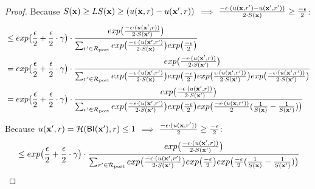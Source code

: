 \documentclass{article}
\begin{document}
\begin{proof}
  Because $S(\textbf{x}) \geq LS(\textbf{x}) \geq (u(\textbf{x}, {r}) - u(\textbf{x}', {r}))$ $\implies$ $ \frac{-\epsilon\cdot(u(\textbf{x}, {r'}) - u(\textbf{x}', {r'}))}{2 \cdot S(\textbf{x})} \geq \frac{-\epsilon}{2}$:
  \begin{equation*}
  \begin{split}
  & \leq exp\big( \frac{\epsilon}{2} + \frac{\epsilon}{2} \cdot \gamma\big) \cdot 
  \frac {
  exp
  \big(
  \frac{-\epsilon\cdot(u(\textbf{x}', {r}))}{2\cdot S(\textbf{x}')}
  \big)
  } 
  {
  \sum_{r'\in \mathcal{R}_{\textup{post}}} 
  exp 
  \big(
  \frac{-\epsilon\cdot(u(\textbf{x}', {r'})}{2 \cdot S(\textbf{x})}
  \big)
  exp 
  \big(
  \frac{-\epsilon}{2}
  \big)
  }\\
  & = exp\big( \frac{\epsilon}{2} + \frac{\epsilon}{2} \cdot \gamma\big) \cdot 
  \frac {
  exp
  \big(
  \frac{-\epsilon\cdot(u(\textbf{x}', {r}))}{2\cdot S(\textbf{x}')}
  \big)
  } 
  {
  \sum_{r'\in \mathcal{R}_{\textup{post}}} 
  exp 
  \big(
  \frac{-\epsilon\cdot(u(\textbf{x}', {r'})}{2 \cdot S(\textbf{x})}
  \big)
  exp 
  \big(
  \frac{-\epsilon}{2}
  \big)
  exp
  \big(
  \frac{\epsilon\cdot(u(\textbf{x}', {r'}))}{2\cdot S(\textbf{x}')}
  \big)
  exp
  \big(
  \frac{-\epsilon\cdot(u(\textbf{x}', {r'}))}{2\cdot S(\textbf{x}')}
  \big)
  }\\
  & = exp\big( \frac{\epsilon}{2} + \frac{\epsilon}{2} \cdot \gamma\big) \cdot 
  \frac {
  exp
  \big(
  \frac{-\epsilon\cdot(u(\textbf{x}', {r}))}{2\cdot S(\textbf{x}')}
  \big)
  } 
  {
  \sum_{r'\in \mathcal{R}_{\textup{post}}} 
  exp 
  \big(
  \frac{-\epsilon\cdot(u(\textbf{x}', {r'})}{2 \cdot S(\textbf{x}')}
  \big)
  exp 
  \big(
  \frac{-\epsilon}{2}
  \big)
  exp
  \big(
  \frac{- \epsilon\cdot(u(\textbf{x}, {r'}))}{2}
  (\frac{1}{S(\textbf{x})}
-
  \frac{1}{S(\textbf{x}')})
  \big)
  }\\
  \end{split}
  \end{equation*}

  Because $u(\textbf{x}', {r}) = \mathcal{H}(\mathsf{BI}(\textbf{x}'), r) \leq 1$ $\implies$ $\frac{- \epsilon\cdot(u(\textbf{x}, {r'}))}{2} \geq  \frac{-\epsilon}{2}$:
  \begin{equation*}
  \begin{split}
  & \leq exp\big( \frac{\epsilon}{2} + \frac{\epsilon}{2} \cdot \gamma\big) \cdot 
  \frac {
  exp
  \big(
  \frac{-\epsilon\cdot(u(\textbf{x}', {r}))}{2\cdot S(\textbf{x}')}
  \big)
  } 
  {
  \sum_{r'\in \mathcal{R}_{\textup{post}}} 
  exp 
  \big(
  \frac{-\epsilon\cdot(u(\textbf{x}', {r'})}{2 \cdot S(\textbf{x}')}
  \big)
  exp 
  \big(
  \frac{-\epsilon}{2}
  \big)
  exp
  \big(
  \frac{- \epsilon}{2}
  (\frac{1}{S(\textbf{x})}
-
  \frac{1}{S(\textbf{x}')})
  \big)
  }\\
  \end{split}
  \end{equation*}


\end{proof}
\end{document}
